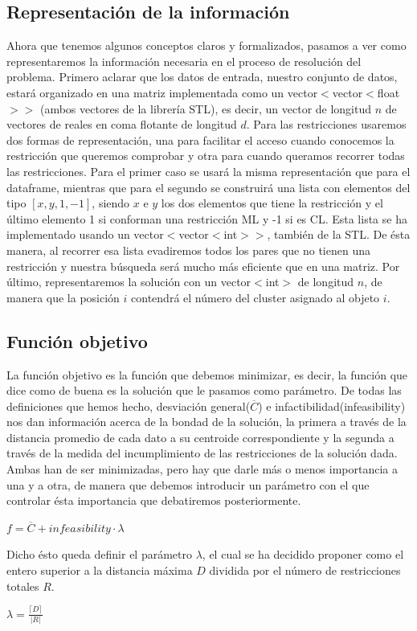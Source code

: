 \documentclass{article}
\providecommand{\abs}[1]{\lvert#1\rvert}
\begin{document}
	\subsection{Representación de la información}
	Ahora que tenemos algunos conceptos claros y formalizados, pasamos a ver como representaremos
	la información necesaria en el proceso de resolución del problema.
	Primero aclarar que los datos de entrada, nuestro conjunto de datos, estará organizado en una matriz
	implementada como un vector$<$vector$<$float$>>$ (ambos vectores de la librería STL), es decir, un
	vector de longitud $n$ de vectores de reales en coma flotante de longitud $d$.
	Para las restricciones usaremos dos formas de representación, una para facilitar el acceso cuando
	conocemos la restricción que queremos comprobar y otra para cuando queramos recorrer todas las
	restricciones. Para el primer caso se usará la misma representación que para el dataframe, mientras
	que para el segundo se construirá una lista con elementos del tipo $[x,y,{1,-1}]$, siendo $x$ e $y$ los dos
	elementos que tiene la restricción y el último elemento 1 si conforman una restricción ML y -1 si es
	CL. Esta lista se ha implementado usando un vector$<$vector$<$int$>>$, también de la STL. De ésta
	manera, al recorrer esa lista evadiremos todos los pares que no tienen una restricción y nuestra
	búsqueda será mucho más eficiente que en una matriz.
	Por último, representaremos la solución con un vector$<$int$>$ de longitud $n$, de manera que la
	posición $i$ contendrá el número del cluster asignado al objeto $i$.
	
	\subsection{Función objetivo}
	La función objetivo es la función que debemos minimizar, es decir, la función que dice como de
	buena es la solución que le pasamos como parámetro.
	De todas las definiciones que hemos hecho, desviación general($\overline{C}$) e infactibilidad(infeasibility)
	nos dan información acerca de la bondad de la solución, la primera a través de la distancia promedio
	de cada dato a su centroide correspondiente y la segunda a través de la medida del incumplimiento
	de las restricciones de la solución dada. Ambas han de ser minimizadas, pero hay que darle más o
	menos importancia a una y a otra, de manera que debemos introducir un parámetro con el que
	controlar ésta importancia que debatiremos posteriormente.\par
	{\centering $f = \overline{C}+infeasibility\cdot \lambda$\par}
	Dicho ésto queda definir el parámetro $\lambda$, el cual se ha decidido proponer como el entero superior a
	la distancia máxima $D$ dividida por el número de restricciones totales $R$.\par
	{\centering $\lambda = \frac{\lceil D \rceil}{\abs{R}}$\par}
	
\end{document}
